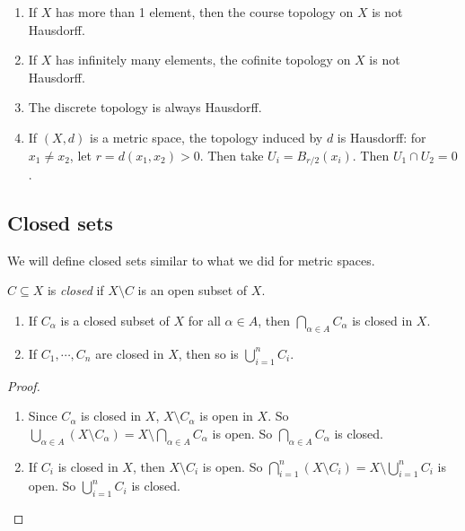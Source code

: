 \documentclass[a4paper]{article}
\begin{document}
\begin{eg}\leavevmode
  \begin{enumerate}
    \item If $X$ has more than 1 element, then the course topology on $X$ is not Hausdorff.
    \item If $X$ has infinitely many elements, the cofinite topology on $X$ is not Hausdorff.
    \item The discrete topology is always Hausdorff.
    \item If $(X, d)$ is a metric space, the topology induced by $d$ is Hausdorff: for $x_1 \not= x_2$, let $r = d(x_1, x_2) > 0$. Then take $U_i = B_{r/2}(x_i)$. Then $U_1 \cap U_2 = 0$.
  \end{enumerate}
\end{eg}

\subsection{Closed sets}
We will define closed sets similar to what we did for metric spaces.

\begin{defi}
  $C\subseteq X$ is \emph{closed} if $X\setminus C$ is an open subset of $X$.
\end{defi}

\begin{lemma}\leavevmode
  \begin{enumerate}
    \item If $C_\alpha$ is a closed subset of $X$ for all $\alpha \in A$, then $\bigcap_{\alpha \in A} C_\alpha$ is closed in $X$.
    \item If $C_1, \cdots, C_n$ are closed in $X$, then so is $\bigcup_{i = 1}^n C_i$.
  \end{enumerate}
\end{lemma}

\begin{proof}\leavevmode
  \begin{enumerate}
    \item Since $C_\alpha$ is closed in $X$, $X \setminus C_\alpha$ is open in $X$. So $\bigcup_{\alpha\in A}(X\setminus C_\alpha) = X\setminus \bigcap_{\alpha\in A}C_\alpha$ is open. So $\bigcap_{\alpha \in A}C_\alpha$ is closed.

    \item If $C_i$ is closed in $X$, then $X\setminus C_i$ is open. So $\bigcap_{i = 1}^n (X\setminus C_i) = X\setminus \bigcup_{i = 1}^n C_i$ is open. So $\bigcup_{i = 1}^n C_i$ is closed.
  \end{enumerate}
\end{proof}
\end{document}
